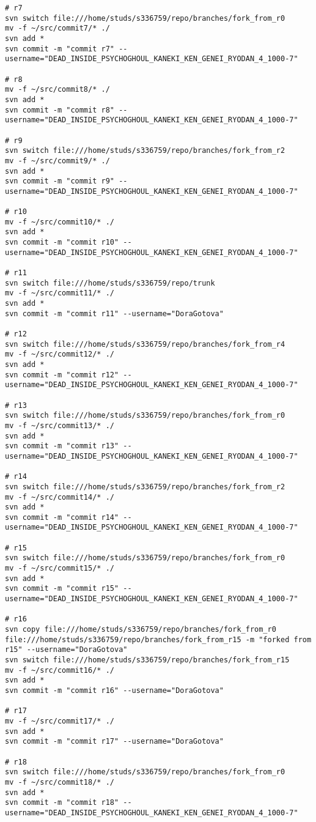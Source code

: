 \begin{verbatim}
# r7
svn switch file:///home/studs/s336759/repo/branches/fork_from_r0
mv -f ~/src/commit7/* ./
svn add *
svn commit -m "commit r7" --username="DEAD_INSIDE_PSYCHOGHOUL_KANEKI_KEN_GENEI_RYODAN_4_1000-7"

# r8
mv -f ~/src/commit8/* ./
svn add *
svn commit -m "commit r8" --username="DEAD_INSIDE_PSYCHOGHOUL_KANEKI_KEN_GENEI_RYODAN_4_1000-7"

# r9
svn switch file:///home/studs/s336759/repo/branches/fork_from_r2
mv -f ~/src/commit9/* ./
svn add *
svn commit -m "commit r9" --username="DEAD_INSIDE_PSYCHOGHOUL_KANEKI_KEN_GENEI_RYODAN_4_1000-7"

# r10
mv -f ~/src/commit10/* ./
svn add *
svn commit -m "commit r10" --username="DEAD_INSIDE_PSYCHOGHOUL_KANEKI_KEN_GENEI_RYODAN_4_1000-7"

# r11
svn switch file:///home/studs/s336759/repo/trunk
mv -f ~/src/commit11/* ./
svn add *
svn commit -m "commit r11" --username="DoraGotova"

# r12
svn switch file:///home/studs/s336759/repo/branches/fork_from_r4
mv -f ~/src/commit12/* ./
svn add *
svn commit -m "commit r12" --username="DEAD_INSIDE_PSYCHOGHOUL_KANEKI_KEN_GENEI_RYODAN_4_1000-7"

# r13
svn switch file:///home/studs/s336759/repo/branches/fork_from_r0
mv -f ~/src/commit13/* ./
svn add *
svn commit -m "commit r13" --username="DEAD_INSIDE_PSYCHOGHOUL_KANEKI_KEN_GENEI_RYODAN_4_1000-7"

# r14
svn switch file:///home/studs/s336759/repo/branches/fork_from_r2
mv -f ~/src/commit14/* ./
svn add *
svn commit -m "commit r14" --username="DEAD_INSIDE_PSYCHOGHOUL_KANEKI_KEN_GENEI_RYODAN_4_1000-7"

# r15
svn switch file:///home/studs/s336759/repo/branches/fork_from_r0
mv -f ~/src/commit15/* ./
svn add *
svn commit -m "commit r15" --username="DEAD_INSIDE_PSYCHOGHOUL_KANEKI_KEN_GENEI_RYODAN_4_1000-7"

# r16
svn copy file:///home/studs/s336759/repo/branches/fork_from_r0 file:///home/studs/s336759/repo/branches/fork_from_r15 -m "forked from r15" --username="DoraGotova"
svn switch file:///home/studs/s336759/repo/branches/fork_from_r15
mv -f ~/src/commit16/* ./
svn add *
svn commit -m "commit r16" --username="DoraGotova"

# r17
mv -f ~/src/commit17/* ./
svn add *
svn commit -m "commit r17" --username="DoraGotova"

# r18
svn switch file:///home/studs/s336759/repo/branches/fork_from_r0
mv -f ~/src/commit18/* ./
svn add *
svn commit -m "commit r18" --username="DEAD_INSIDE_PSYCHOGHOUL_KANEKI_KEN_GENEI_RYODAN_4_1000-7"


\end{verbatim}
